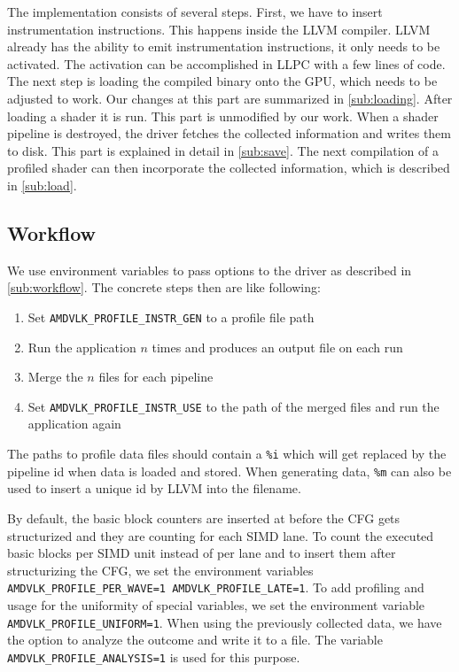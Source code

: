 \clearpage
{}
The implementation consists of several steps. First, we have to insert instrumentation instructions. This happens inside the LLVM compiler. LLVM already has the ability to emit instrumentation instructions, it only needs to be activated. The activation can be accomplished in LLPC with a few lines of code. The next step is loading the compiled binary onto the GPU, which needs to be adjusted to work. Our changes at this part are summarized in \cref{sub:loading}. After loading a shader it is run. This part is unmodified by our work. When a shader pipeline is destroyed, the driver fetches the collected information and writes them to disk. This part is explained in detail in \cref{sub:save}. The next compilation of a profiled shader can then incorporate the collected information, which is described in \cref{sub:load}.

\subsection{Workflow}
\label{sub:impl_workflow}
We use environment variables to pass options to the driver as described in \cref{sub:workflow}.
The concrete steps then are like following:
\begin{enumerate}
	\item Set \texttt{AMDVLK\_PROFILE\_INSTR\_GEN} to a profile file path
	\item Run the application $n$ times and produces an output file on each run
	\item Merge the $n$ files for each pipeline
	\item Set \texttt{AMDVLK\_PROFILE\_INSTR\_USE} to the path of the merged files and run the application again
\end{enumerate}
The paths to profile data files should contain a \texttt{\%i} which will get replaced by the pipeline id when data is loaded and stored.
When generating data, \texttt{\%m} can also be used to insert a unique id by LLVM into the filename.

By default, the basic block counters are inserted at before the CFG gets structurized and they are counting for each SIMD lane.
To count the executed basic blocks per SIMD unit instead of per lane and to insert them after structurizing the CFG, we set the environment variables \texttt{AMDVLK\_PROFILE\_PER\_WAVE=1 AMDVLK\_PROFILE\_LATE=1}.
To add profiling and usage for the uniformity of special variables, we set the environment variable \texttt{AMDVLK\_PROFILE\_UNIFORM=1}.
When using the previously collected data, we have the option to analyze the outcome and write it to a file. The variable \texttt{AMDVLK\_PROFILE\_ANALYSIS=1} is used for this purpose.

